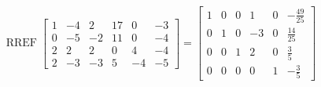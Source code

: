 \begin{exerciseAnswer} 


\[\operatorname{RREF} \left[\begin{array}{cccccc}
1 & -4 & 2 & 17 & 0 & -3 \\
0 & -5 & -2 & 11 & 0 & -4 \\
2 & 2 & 2 & 0 & 4 & -4 \\
2 & -3 & -3 & 5 & -4 & -5
\end{array}\right] = \left[\begin{array}{cccccc}
1 & 0 & 0 & 1 & 0 & -\frac{49}{25} \\
0 & 1 & 0 & -3 & 0 & \frac{14}{25} \\
0 & 0 & 1 & 2 & 0 & \frac{3}{5} \\
0 & 0 & 0 & 0 & 1 & -\frac{3}{5}
\end{array}\right] \]



\end{exerciseAnswer}
